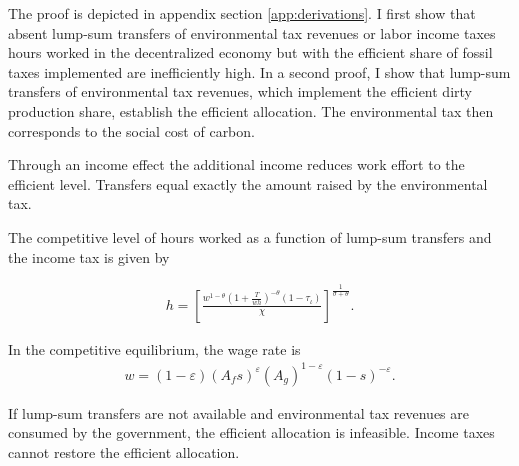 
 The proof is depicted in appendix section \ref{app:derivations}. I first show that absent lump-sum transfers of environmental tax revenues or labor income taxes hours worked in the decentralized economy but with the efficient share of fossil taxes implemented are inefficiently high. In a second proof, I show that lump-sum transfers of environmental tax revenues, which implement the efficient dirty production share, establish the efficient allocation.  The environmental tax then corresponds to the social cost of carbon. %
 
  Through an income effect the additional income reduces work effort to the efficient level. Transfers equal exactly the amount raised by the environmental tax. 


The competitive level of hours worked as a function of lump-sum transfers and the income tax is given by

\begin{align}
h = \left[\frac{w^{1-\theta}\left(1+\frac{T}{wh}\right)^{-\theta}(1-\tau_{\iota})}{\chi}\right]^{\frac{1}{\sigma+\theta}}.\label{eq:hopt}
\end{align}


In the competitive equilibrium, the wage rate is
\begin{align}
w= (1-\varepsilon)(A_fs)^\varepsilon (A_g)^{1-\varepsilon}(1-s)^{-\varepsilon}. \label{eq:compw}
\end{align}


\begin{prop}
	If lump-sum transfers are not available and environmental tax revenues are consumed by the government, the efficient allocation is infeasible. Income taxes  cannot restore the efficient allocation. 
\end{prop}


